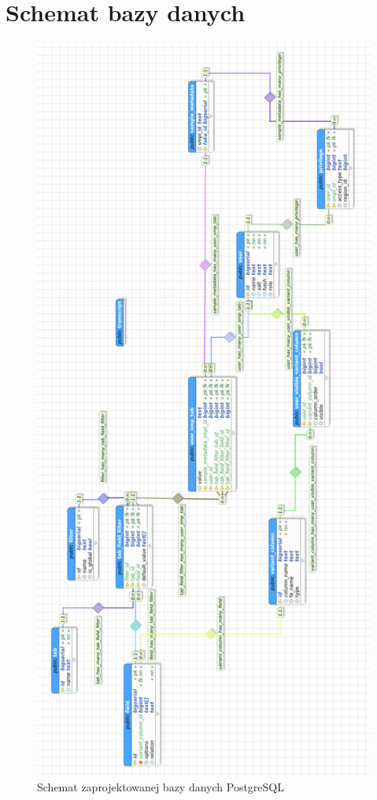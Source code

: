 \documentclass[a4paper,12pt,twoside]{article}
\begin{document}
\section{Schemat bazy danych}
\begin{figure}[h!]
\includegraphics[width=\textwidth, height=0.9\textheight]{obrazy/aplikacja/database2.png}
\caption{Schemat zaprojektowanej bazy danych PostgreSQL}
\label{fig:bazadanych}
\end{figure}
\end{document}
